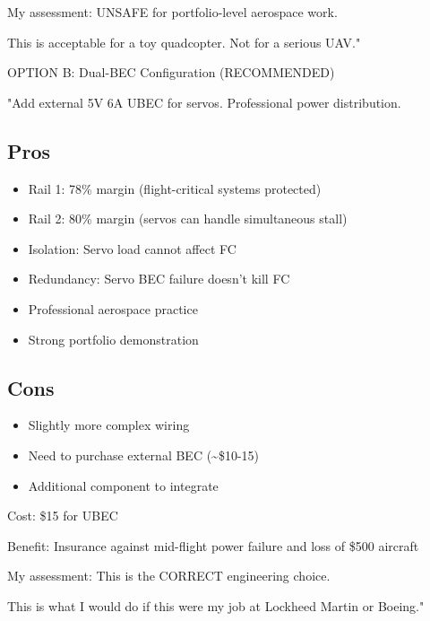 \documentclass[11pt,letterpaper]{article}
\begin{document}
{My assessment: UNSAFE for portfolio-level aerospace work.\par

This is acceptable for a toy quadcopter. Not for a serious UAV."\par

OPTION B: Dual-BEC Configuration (RECOMMENDED)\par

"Add external 5V 6A UBEC for servos. Professional power distribution.\par

\subsection{Pros}

\begin{itemize}
  \item Rail 1: 78\% margin (flight-critical systems protected)
  \item Rail 2: 80\% margin (servos can handle simultaneous stall)
  \item Isolation: Servo load cannot affect FC
  \item Redundancy: Servo BEC failure doesn't kill FC
  \item Professional aerospace practice
  \item Strong portfolio demonstration
\end{itemize}

\subsection{Cons}

\begin{itemize}
  \item Slightly more complex wiring
  \item Need to purchase external BEC (\textasciitilde{}\$10-15)
  \item Additional component to integrate
\end{itemize}

Cost: \$15 for UBEC\par

Benefit: Insurance against mid-flight power failure and loss of \$500 aircraft\par

My assessment: This is the CORRECT engineering choice.\par

This is what I would do if this were my job at Lockheed Martin or Boeing."\par

}
\end{document}
